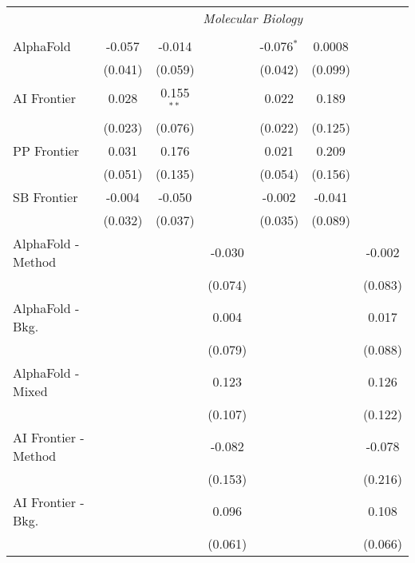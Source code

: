 \begin{tabular}{lcccccc}
 & \multicolumn{6}{c}{\textit{Molecular Biology}} \\ \\
   AlphaFold            & -0.057  & -0.014       &               & -0.076$^{*}$ & 0.0008  &   \\   
                        & (0.041) & (0.059)      &               & (0.042)      & (0.099) &   \\   
   AI Frontier          & 0.028   & 0.155$^{**}$ &               & 0.022        & 0.189   &   \\   
                        & (0.023) & (0.076)      &               & (0.022)      & (0.125) &   \\   
   PP Frontier          & 0.031   & 0.176        &               & 0.021        & 0.209   &   \\   
                        & (0.051) & (0.135)      &               & (0.054)      & (0.156) &   \\   
   SB Frontier          & -0.004  & -0.050       &               & -0.002       & -0.041  &   \\   
                        & (0.032) & (0.037)      &               & (0.035)      & (0.089) &   \\   
   AlphaFold - Method   &         &              & -0.030        &              &         & -0.002\\   
                        &         &              & (0.074)       &              &         & (0.083)\\   
   AlphaFold - Bkg.     &         &              & 0.004         &              &         & 0.017\\   
                        &         &              & (0.079)       &              &         & (0.088)\\   
   AlphaFold - Mixed    &         &              & 0.123         &              &         & 0.126\\   
                        &         &              & (0.107)       &              &         & (0.122)\\   
   AI Frontier - Method &         &              & -0.082        &              &         & -0.078\\   
                        &         &              & (0.153)       &              &         & (0.216)\\   
   AI Frontier - Bkg.   &         &              & 0.096         &              &         & 0.108\\   
                        &         &              & (0.061)       &              &         & (0.066)\\   

\end{tabular}
